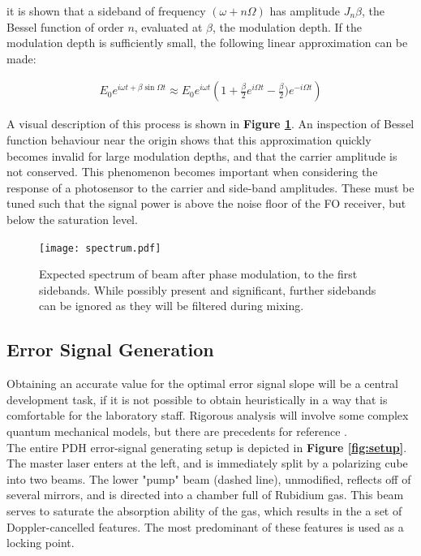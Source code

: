 it is shown that a sideband of frequency $(\omega +n\Omega)$ has amplitude
$J_n{\beta}$, the Bessel function of order $n$, evaluated at $\beta$, the
modulation depth. If the modulation depth is sufficiently small, the following
linear approximation can be made:

\begin{gather}
  E_0 e^{i \omega t + \beta \sin \Omega t}  \approx
    E_0 e^{i\omega t} \left(1 + \frac{\beta}{2}e^{i\Omega t} -
      \frac{\beta}{2}) e^{-i\Omega t} \right)
\end{gather}

A visual description of this process is shown in
\textbf{Figure \ref{fig:eom_spectrum}}.
An inspection of Bessel function behaviour near the origin shows that
this approximation quickly becomes invalid for large modulation depths, and
that the carrier amplitude is not conserved. This phenomenon becomes important
when considering the response of a photosensor to the carrier and side-band
amplitudes. These must be tuned such that the signal power is above the noise
floor of the FO receiver, but below the saturation level.

\begin{figure}
  \centering
  \texttt{[image: spectrum.pdf]}
  \caption{Expected spectrum of beam after phase modulation, to the first
  sidebands. While possibly present and significant, further sidebands can
  be ignored as they will be filtered during mixing.}
  \label{fig:eom_spectrum}
\end{figure}

\subsection{Error Signal Generation}

Obtaining an accurate value for the optimal error signal slope will be a central
development task, if it is not possible to obtain heuristically in
a way that is comfortable for the laboratory staff. Rigorous analysis will
involve some complex quantum mechanical models, but there are precedents for
reference \cite{maguire2006}. \\

The entire PDH error-signal generating setup is depicted in
\textbf{ Figure \ref{fig:setup}}.
The master laser enters at the left, and is immediately split by a
polarizing cube into two beams.  The lower "pump" beam (dashed line), unmodified,
reflects off of several mirrors, and is directed into a chamber full of
Rubidium gas. This beam serves to saturate the absorption ability of the gas,
which results in the a set of Doppler-cancelled features.
The most predominant of these features is used as a locking point. \\

